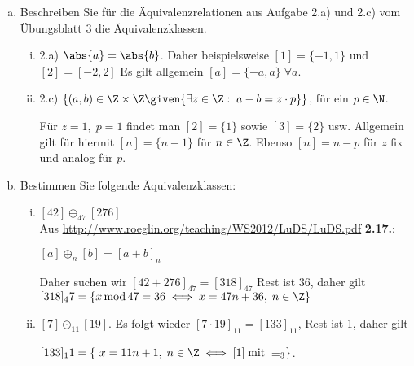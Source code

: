   \begin{enumerate}[a)]
    \item Beschreiben Sie für die Äquivalenzrelationen aus Aufgabe 2.a) und 2.c) vom Übungsblatt 3 die Äquivalenzklassen.
      \begin{enumerate}[i)]
        \item 2.a) $\abs{a} = \abs{b}$. Daher beispielsweise $[1] = \{-1, 1\}$ und $[2] = [-2, 2]$ Es gilt allgemein $[a] = \{ -a, a \} \; \forall a$.

        \item 2.c) $\{  (a,b) \in \Z \times \Z \given {\exists z \in \Z: \; a-b = z \cdot p}  \}$, für ein $p \in \N$.

        Für $z = 1, \; p=1$ findet man $[2] = \{1\}$ sowie $[3] = \{2\}$ usw. Allgemein gilt für hiermit $[n] = \{n-1\}$ für $n \in \Z$. Ebenso $[n] = n-p$ für $z$ fix und analog für $p$.


      \end{enumerate}


    \item Bestimmen Sie folgende Äquivalenzklassen:

    \begin{enumerate}[i)]
      \item $[42] \oplus_{47} [276]$\\
      Aus \url{http://www.roeglin.org/teaching/WS2012/LuDS/LuDS.pdf}{ \textbf{2.17.}}:

      \begin{definition}$[a] \oplus_{n} [b] = [a + b]_n$
      \end{definition}
      Daher suchen wir $[42 + 276]_47 = [318]_47$ Rest ist 36, daher gilt $[318]_47 = \{ x \, \text{mod} \, 47 = 36 \iff x = 47n + 36, \; n \in \Z  \} $

      \item $ [7] \odot_11 [19] $. Es folgt wieder $ [7 \cdot 19]_11 = [133]_11 $, Rest ist 1, daher gilt

      $ [133]_11 = \{\ x = 11n + 1, \; n \in \Z \iff [1] \; \text{mit} \; \equiv_{3} \} $.



    \end{enumerate}
  \end{enumerate}



